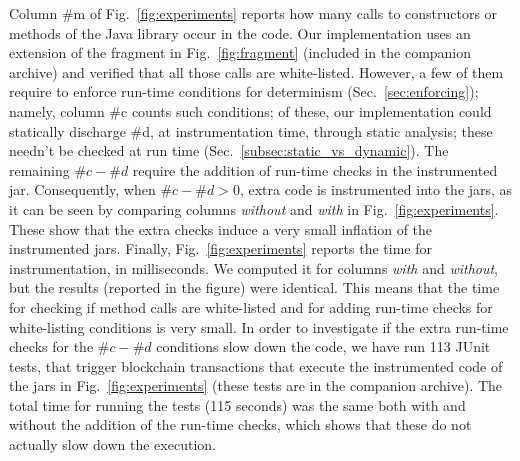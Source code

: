 Column \#m of Fig.~\ref{fig:experiments} reports how many calls to constructors
or methods of the Java library occur in the code. Our implementation
uses an extension of the fragment in Fig.~\ref{fig:fragment} (included in the
companion archive) and verified that all those calls are white-listed.
However, a few of them require to enforce run-time conditions for determinism
(Sec.~\ref{sec:enforcing}); namely, column \#c counts such conditions;
of these, our implementation could statically discharge \#d, at instrumentation time,
through static analysis; these needn't
be checked at run time (Sec.~\ref{subsec:static_vs_dynamic}). The remaining
$\#c - \#d$ require the addition of run-time checks in the instrumented jar. Consequently,
when $\#c - \#d > 0$, extra code is instrumented into the jars, as it can be seen by comparing
columns \emph{without} and \emph{with} in Fig.~\ref{fig:experiments}. These
show that the extra checks induce a very small inflation of the instrumented jars.
Finally, Fig.~\ref{fig:experiments} reports the time for instrumentation, in milliseconds.
We computed it for columns \emph{with} and \emph{without}, but the results
(reported in the figure) were identical. This means that the time for
checking if method calls are white-listed and for adding run-time checks for white-listing
conditions is very small.
In order to investigate if the extra run-time checks for the $\#c - \#d$ conditions
slow down the code, we have run 113 JUnit tests, that trigger blockchain transactions
that execute the instrumented code of the jars in Fig.~\ref{fig:experiments}
(these tests are in the companion archive). The total time for running the
tests (115 seconds) was the same both with and without
the addition of the run-time checks, which shows that
these do not actually slow down the execution.
